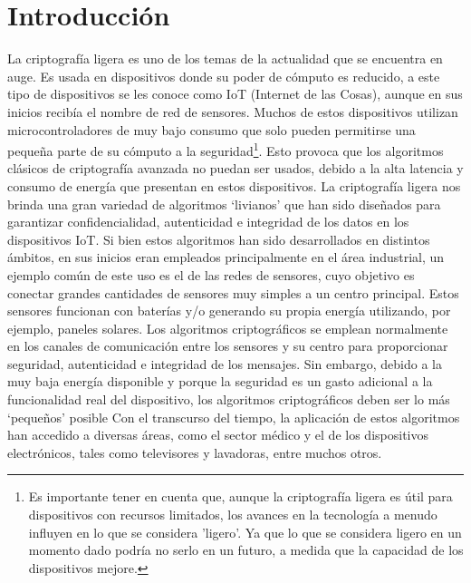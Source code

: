 \documentclass[a4paper,10pt]{article}
\begin{document}
	\section{Introducción}
	\label{seccion1}
	La criptografía ligera es uno de los temas de la actualidad que se encuentra en auge. Es usada en dispositivos donde su poder de cómputo es reducido, a este tipo de dispositivos se les conoce como IoT (Internet de las Cosas), aunque en sus inicios recibía el nombre de red de sensores. Muchos de estos dispositivos utilizan microcontroladores de muy bajo consumo que solo pueden permitirse una pequeña parte de su cómputo a la seguridad\footnote{Es importante tener en cuenta que, aunque la criptografía ligera es útil para dispositivos con recursos limitados, los avances en la tecnología a menudo influyen en lo que se considera 'ligero'. Ya que lo que se considera ligero en un momento dado podría no serlo en un futuro, a medida que la capacidad de los dispositivos mejore.}. Esto provoca que los algoritmos clásicos de criptografía avanzada no puedan ser usados, debido a la alta latencia y consumo de energía que presentan en estos dispositivos. La criptografía ligera nos brinda una gran variedad de algoritmos ‘livianos’ que han sido diseñados para garantizar confidencialidad, autenticidad e integridad de los datos en los dispositivos IoT. Si bien estos algoritmos han sido desarrollados en distintos ámbitos, en sus inicios eran empleados principalmente en el área industrial, un ejemplo común de este uso es el de las redes de sensores, cuyo objetivo es conectar grandes cantidades de sensores muy simples a un centro principal. Estos sensores funcionan con baterías y/o generando su propia energía utilizando, por ejemplo, paneles solares. Los algoritmos criptográficos se emplean normalmente en los canales de comunicación entre los sensores y su centro para proporcionar seguridad, autenticidad e integridad de los mensajes. Sin embargo, debido a la muy baja energía disponible y porque la seguridad es un gasto adicional a la funcionalidad real del dispositivo, los algoritmos criptográficos deben ser lo más ‘pequeños’ posible \parencite[1]{biryukov2017state}
	Con el transcurso del tiempo, la aplicación de estos algoritmos han accedido a diversas áreas, como el sector médico y el de los dispositivos electrónicos, tales como televisores y lavadoras, entre muchos otros.
	
\end{document}
